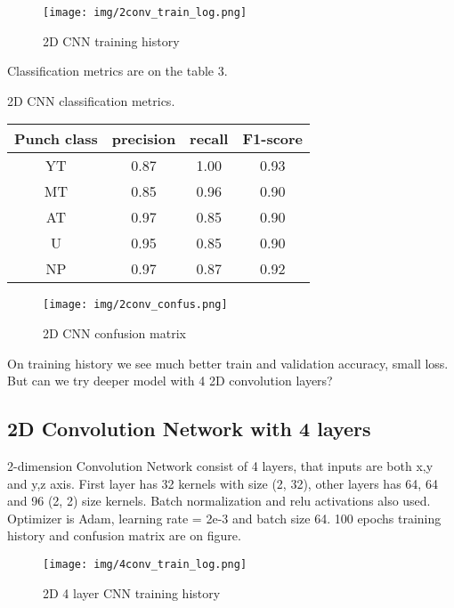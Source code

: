 \documentclass[sport,article,submit,moreauthors,pdftex]{Definitions/mdpi}
\begin{document}
\begin{figure}[H]
\texttt{[image: img/2conv\_train\_log.png]}
\caption{2D CNN training history}
\end{figure} 

Classification metrics are on the table 3.

\begin{specialtable}[H] 
\caption{2D CNN classification metrics.\label{tab3}}
\begin{tabular}{cccc}
\toprule
\textbf{Punch class}	&\textbf{precision}	& \textbf{recall}	& \textbf{F1-score}\\
\midrule
YT		& 0.87		& 1.00		& 0.93 \\
MT		& 0.85		& 0.96		& 0.90 \\
AT		& 0.97		& 0.85		& 0.90 \\
U		& 0.95		& 0.85		& 0.90 \\
NP		& 0.97		& 0.87		& 0.92 \\
\bottomrule
\end{tabular}
\end{specialtable}

\begin{figure}[H]
\texttt{[image: img/2conv\_confus.png]}
\caption{2D CNN confusion matrix}
\end{figure} 


On training history we see much better train and validation accuracy, small loss.
But can we try deeper model with 4 2D convolution layers?


\subsection{2D Convolution Network with 4 layers}

2-dimension Convolution Network consist of 4 layers, that inputs are both x,y and y,z axis. First layer has 32 kernels with size (2, 32), other layers has 64, 64 and 96 (2, 2) size kernels. Batch normalization and relu activations also used. 
Optimizer is Adam, learning rate = 2e-3 and batch size 64.
100 epochs training history and confusion matrix are on figure.

\begin{figure}[H]
\texttt{[image: img/4conv\_train\_log.png]}
\caption{2D 4 layer CNN training history}
\end{figure} 
\end{document}
